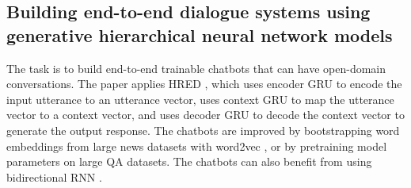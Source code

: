 \subsection{Building end-to-end dialogue systems using generative hierarchical neural network models \cite{Serban2016}}

The task is to build end-to-end trainable chatbots that can have open-domain conversations. The paper applies HRED \cite{Sordoni2015a}, which uses encoder GRU \cite{Chung2014Empirical, Cho2014Learning} to encode the input utterance to an utterance vector, uses context GRU to map the utterance vector to a context vector, and uses decoder GRU to decode the context vector to generate the output response. The chatbots are improved by bootstrapping word embeddings from large news datasets with word2vec \cite{Mikolov2014Empirical}, or by pretraining model parameters on large QA datasets. The chatbots can also benefit from using bidirectional RNN \cite{Sundermeyer2014Translation}.
